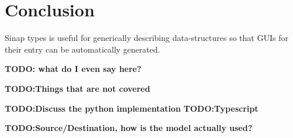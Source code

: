 \documentclass{article}
\begin{document}
\section{Conclusion}
Sinap types is useful for generically describing data-structures 
so that GUIs for their entry can be automatically generated. 

\textbf{TODO: what do I even say here?}

\textbf{TODO:Things that are not covered}

\textbf{TODO:Discuss the python implementation}
\textbf{TODO:Typescript}

\textbf{TODO:Source/Destination, how is the model actually used?}
\end{document}
